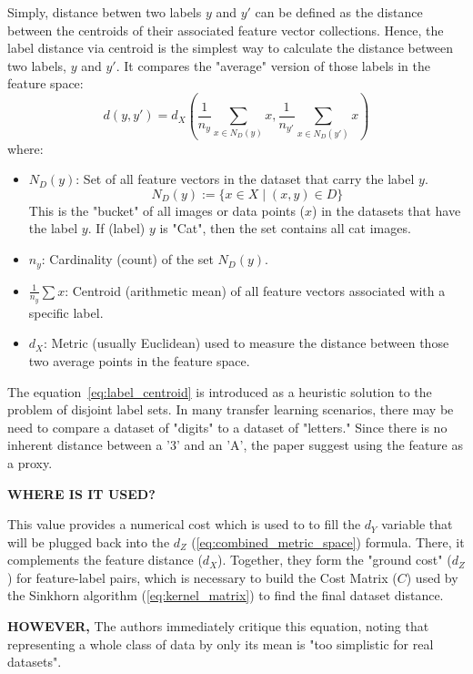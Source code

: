 \documentclass[11pt, a4paper]{article}
\theoremstyle{plain} %
\theoremstyle{definition} %
\begin{document}
			Simply, distance betwen two labels $y$ and $y'$ can be defined as the distance between the centroids of their associated feature vector collections. Hence, the label distance via centroid is the simplest way to calculate the distance between two labels, $y$ and $y'$. It compares the "average" version of those labels in the feature space:
			\begin{equation}
				\label{eq:label_centroid}
				d(y, y') = d_X \left( \frac{1}{n_y} \sum_{x \in N_D(y)} x, \frac{1}{n_{y'}} \sum_{x \in N_D(y')} x \right)
			\end{equation}
			where:
			\begin{itemize}
				\item $N_D(y)$: Set of all feature vectors in the dataset that carry the label $y$. $$N_D(y) := \{x \in X \mid (x,y) \in D\}$$
				This is the "bucket" of all images or data points ($x$) in the datasets that have the label $y$. If (label) $y$ is "Cat", then the set contains all cat images.
				\item $n_y$: Cardinality (count) of the set $N_D(y)$.
				\item $\frac{1}{n_y} \sum x$: Centroid (arithmetic mean) of all feature vectors associated with a specific label.
				\item $d_X$: Metric (usually Euclidean) used to measure the distance between those two average points in the feature space.
			\end{itemize}
			The equation~\ref{eq:label_centroid} is introduced as a heuristic solution to the problem of disjoint label sets. In many transfer learning scenarios, there may be need to compare a dataset of "digits" to a dataset of "letters." Since there is no inherent distance between a '3' and an 'A', the paper suggest using the feature as a proxy. 

			\textbf{WHERE IS IT USED?}

			This value provides a numerical cost which is used to to fill the $d_Y$ variable that will be plugged back into the $d_Z$ (\cref{eq:combined_metric_space}) formula. There, it complements the feature distance ($d_X$). Together, they form the "ground cost" ($d_Z$) for feature-label pairs, which is necessary to build the Cost Matrix ($C$) used by the Sinkhorn algorithm (\cref{eq:kernel_matrix}) to find the final dataset distance.

			\textbf{HOWEVER,} The authors immediately critique this equation, noting that representing a whole class of data by only its mean is "too simplistic for real datasets".
\end{document}
